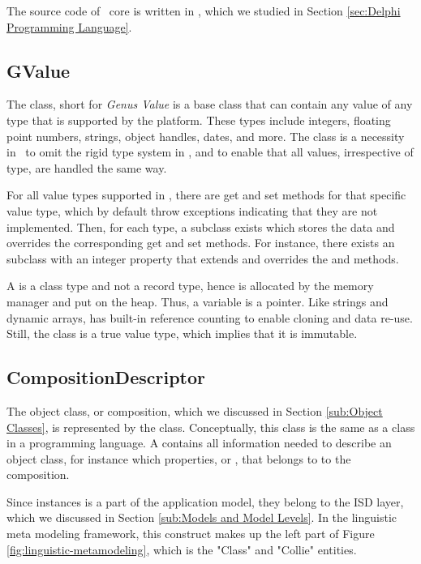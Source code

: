 The source code of \gap~core is written in \delphi, which we studied in Section \ref{sec:Delphi Programming Language}.

\subsection{GValue}
\label{sub:GValue}
The  class, short for \textit{Genus Value} is a base class that can contain any value of any type that is supported by the platform. These types include integers, floating point numbers, strings, object handles, dates, and more. The  class is a necessity in \gap~to omit the rigid type system in \delphi, and to enable that all values, irrespective of type, are handled the same way.

For all value types supported in \gap, there are get and set methods for that specific value type, which by default throw exceptions indicating that they are not implemented. Then, for each type, a subclass exists which stores the data and overrides the corresponding get and set methods. For instance, there exists an  subclass with an integer property that extends  and overrides the  and  methods. 

A  is a class type and not a record type, hence is allocated by the memory manager and put on the heap. Thus, a  variable is a pointer. Like strings and dynamic arrays,  has built-in reference counting to enable cloning and data re-use. Still, the class is a true value type, which implies that it is immutable.

\subsection{CompositionDescriptor}
\label{sub:CompositionDescriptor}
The object class, or composition, which we discussed in Section \ref{sub:Object Classes}, is represented by the  class. Conceptually, this class is the same as a class in a programming language. A  contains all information needed to describe an object class, for instance which properties, or , that belongs to to the composition.

Since  instances is a part of the application model, they belong to the ISD layer, which we discussed in Section \ref{sub:Models and Model Levels}. In the linguistic meta modeling framework, this construct makes up the left part of Figure \ref{fig:linguistic-metamodeling}, which is the "Class" and "Collie" entities.

